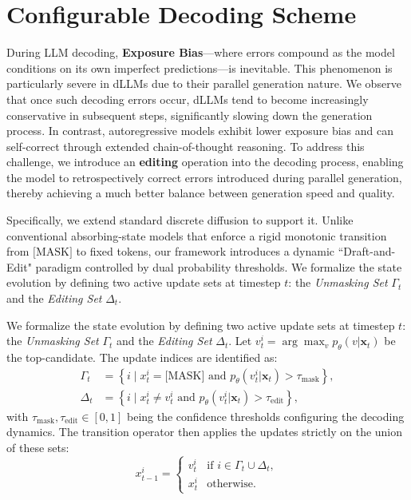 \section{Configurable Decoding Scheme}


\vspace{5pt}
\begin{mdframed}[
    linecolor=gray!40,
    linewidth=1.5pt,
    roundcorner=5pt,
    innertopmargin=5pt,
    innerbottommargin=5pt,
    innerleftmargin=10pt,
    innerrightmargin=10pt,
    backgroundcolor=gray!5
]
During LLM decoding, \textbf{Exposure Bias}—where errors compound as the model conditions on its own imperfect predictions—is inevitable. This phenomenon is particularly severe in dLLMs due to their parallel generation nature. We observe that once such decoding errors occur, dLLMs tend to become increasingly conservative in subsequent steps, significantly slowing down the generation process. In contrast, autoregressive models exhibit lower exposure bias and can self-correct through extended chain-of-thought reasoning. To address this challenge, we introduce an \textbf{editing} operation into the decoding process, enabling the model to retrospectively correct errors introduced during parallel generation, thereby achieving a much better balance between generation speed and quality.
\end{mdframed}


Specifically, we extend standard discrete diffusion to support it. Unlike conventional absorbing-state models that enforce a rigid monotonic transition from $\text{[MASK]}$ to fixed tokens, our framework introduces a dynamic ``Draft-and-Edit" paradigm controlled by dual probability thresholds.
We formalize the state evolution by defining two active update sets at timestep $t$: the \textit{Unmasking Set} $\Gamma_t$ and the \textit{Editing Set} $\Delta_t$.



We formalize the state evolution by defining two active update sets at timestep $t$: the \textit{Unmasking Set} $\Gamma_t$ and the \textit{Editing Set} $\Delta_t$.
Let $v_t^i = \arg\max_{v} p_\theta(v | \bm{x}_t)$ be the top-candidate. The update indices are identified as:
\begin{align}
    \Gamma_t &= \left\{ i \mid x_t^i = \text{[MASK]} \text{ and } p_\theta(v_t^i|\bm{x}_t) > \tau_{\text{mask}} \right\}, \\
    \Delta_t &= \left\{ i \mid x_t^i \neq v_t^i \text{ and } p_\theta(v_t^i|\bm{x}_t) > \tau_{\text{edit}} \right\},
\end{align}
with $\tau_{\text{mask}}, \tau_{\text{edit}} \in [0, 1]$ being the confidence thresholds configuring the decoding dynamics. The transition operator then applies the updates strictly on the union of these sets:
\begin{equation}
    x_{t-1}^i = 
    \begin{cases} 
        v_t^i & \text{if } i \in \Gamma_t \cup \Delta_t, \\
        x_t^i & \text{otherwise}.
    \end{cases}
    \label{eq:set_transition}
\end{equation}
